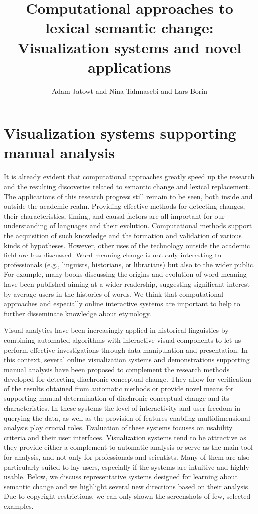 \documentclass[output=paper%
]{langsci/langscibook}
\author{Adam Jatowt\affiliation{University of Innsbruck} and
Nina Tahmasebi\affiliation{University of Gothenburg} and
Lars Borin\affiliation{University of Gothenburg}}
\title[Computational approaches: Visualization systems and novel applications]
      {Computational approaches to lexical semantic change: Visualization systems and novel applications}
\begin{document}
\maketitle

\section{Visualization systems supporting manual analysis}
It is already evident that computational approaches greatly speed up the research and the resulting discoveries related to semantic change and lexical replacement. The applications of this research progress still remain to be seen, both inside and outside the academic realm.
Providing effective methods for detecting changes, their characteristics, timing, and causal factors are all important for our understanding of languages and their evolution. Computational methods support the acquisition of such knowledge and the formation and validation of various kinds of hypotheses. However, other uses of the  technology outside the academic field are less discussed. 
Word meaning change is not only interesting to professionals (e.g., linguists, historians, or librarians) but also to the wider public. For example, many books discussing the origins and evolution of word meaning have been published aiming at a wider readership, suggesting significant interest by average users in the histories of words. 
We think that computational approaches and especially online interactive systems are important to help to further disseminate knowledge about  etymology.

\begin{sloppypar}
Visual analytics have been increasingly applied in  historical linguistics \citep{schatzle:hal-02914284} by combining automated algorithms with interactive visual components to let us perform effective investigations through data manipulation and presentation. In this context, several online visualization systems and demonstrations supporting manual analysis have been proposed to complement the research methods developed for detecting diachronic conceptual change. They allow for verification of the results obtained from automatic methods or provide novel means for supporting manual determination of diachronic conceptual change and its characteristics. In these systems the level of interactivity and user freedom in querying the data, as well as the provision of features enabling multidimensional analysis play crucial roles. Evaluation of these systems focuses on usability criteria and their user interfaces. Visualization systems tend to be attractive as they provide either a complement to automatic analysis or serve as the main tool for analysis, and not only for professionals and scientists. Many of them are also particularly suited to lay users, especially if the systems are intuitive and highly usable. Below, we discuss representative  systems designed for learning about semantic change and we highlight several new directions based on their analysis. Due to copyright restrictions, we can only shown the screenshots of few, selected examples.
\end{sloppypar}
\end{document}
